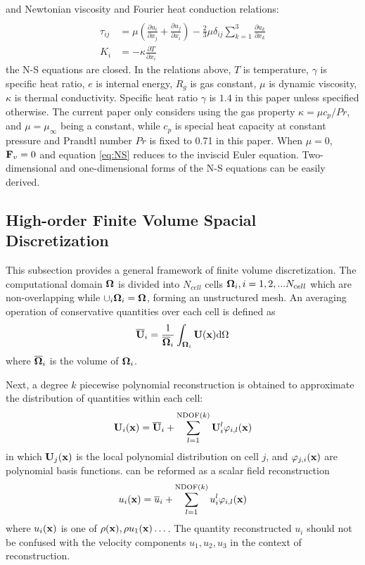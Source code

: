 and Newtonian viscosity and Fourier
heat conduction relations:
\begin{equation}
    \begin{aligned}
        \\
        \tau_{ij} & =
        \mu\left(\frac{\partial u_i}{\partial x_j} + \frac{\partial u_j}{\partial x_i}\right)
        -
        \frac{2}{3}\mu \delta_{ij}\sum_{k=1}^{3}{\frac{\partial u_k}{\partial x_k}} \\
        K_i       & = - \kappa \frac{\partial T}{\partial x_i}
    \end{aligned}
\end{equation}
the N-S equations are closed.
In the relations above, $T$ is temperature,
$\gamma$ is specific heat ratio, $e$ is internal energy,
$R_g$ is  gas constant, $\mu$ is dynamic viscosity,
$\kappa$ is thermal conductivity.
Specific heat ratio $\gamma$ is $1.4$ in this paper unless specified
otherwise.
The current paper only
considers using the gas property $\kappa = \mu c_p / Pr$,
and $\mu=\mu_{\infty}$ being a constant,
while $c_p$ is special heat capacity
at constant pressure and
Prandtl number $Pr$ is fixed to 0.71 in this paper.
When $\mu=0$,
$\mathbf{F}_v=0$ and
equation \eqref{eq:NS} reduces to
the inviscid Euler equation.
Two-dimensional and one-dimensional forms of the N-S equations
can be easily derived.

\subsection{High-order Finite Volume Spacial Discretization}
\label{ssec:FV}




This subsection provides a general framework of
finite volume discretization.
The computational domain $\mathbf{\Omega}$ is divided
into $N_{cell}$ cells $\mathbf{\Omega}_i, i=1,2,...N_{cell}$ which
are non-overlapping while $\cup_i{\mathbf{\Omega}_i} = \mathbf{\Omega}$,
forming an unstructured mesh.
An averaging operation of conservative quantities
over each cell is defined as
\begin{equation}
    \label{eq:FVMean}
    \overline{\mathbf{U}}_i = \frac{1}{\overline{\mathbf{\Omega}}_i}\int_{\mathbf{\Omega}_i}\mathbf{U}(\mathbf{x})\dd \Omega
\end{equation}
where $\overline{\mathbf{\Omega}}_i$ is the volume of $\mathbf{\Omega}_i$.

Next, a degree $k$ piecewise polynomial reconstruction is
obtained to approximate the distribution of
quantities within each cell:
\begin{equation}
    \label{eq:FVRec}
    \mathbf{U}_i(\mathbf{x}) = \overline{\mathbf{U}}_i + \sum_{l=1}^{\mathrm{NDOF}(k)}{\mathbf{U}_i^l\varphi_{i,l}(\mathbf{x}) }
\end{equation}
in which
$\mathbf{U}_j(\mathbf{x})$ is the local polynomial distribution on cell $j$,
and
$\varphi_{j,i}(\mathbf{x})$ are
polynomial basis functions.
 can be reformed as a scalar field reconstruction
\begin{equation}
    \label{eq:FVRecScalar}
    u_i(\mathbf{x}) = \overline{u}_i + \sum_{l=1}^{\mathrm{NDOF}(k)}{u_i^l\varphi_{i,l}(\mathbf{x}) }
\end{equation}
where $u_i(\mathbf{x})$ is one of $\rho(\mathbf{x}), \rho u_1(\mathbf{x})\dots$.
The quantity reconstructed $u_i$ should not
be confused with the velocity components $u_1, u_2, u_3$ in the context of
reconstruction.

